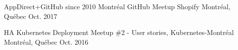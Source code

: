 

\begin{cvhonors}

  \cvhonor
    {AppDirect+GitHub since 2010} %
    {Montréal GitHub Meetup} %
    {Shopify Montréal, Québec} %
    {Oct. 2017} %

  \cvhonor
    {HA Kubernetes Deployment} %
    {Meetup \#2 - User stories, Kubernetes-Montréal} %
    {Montréal, Québec} %
    {Oct. 2016} %

\end{cvhonors}
